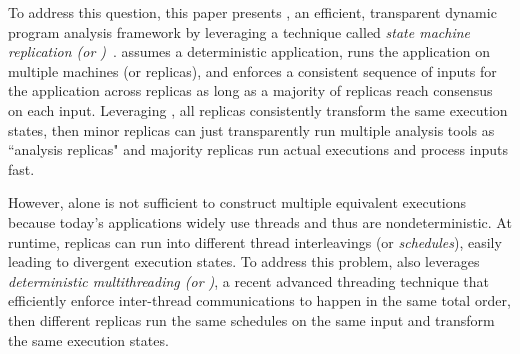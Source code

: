 

To address this question, this paper presents \xxx, an efficient, 
transparent dynamic program analysis framework by leveraging a technique called 
\emph{state machine replication (or \smr)}~\cite{paxos:simple, 
paxos:practical, paxos}. \smr assumes a deterministic application, runs the 
application on multiple machines (or replicas), and enforces a consistent 
sequence of inputs for the application across replicas as long as a majority of 
replicas reach consensus on each input. Leveraging \smr, all replicas
consistently transform the same execution states, then minor replicas can just
transparently run multiple analysis tools as ``analysis replicas" and majority
replicas run actual executions and process inputs fast.


However, \smr alone is not sufficient to construct multiple equivalent 
executions because today's applications widely use threads and thus are 
nondeterministic. At runtime, replicas can run into different thread
interleavings (or \emph{schedules}), easily leading to divergent execution
states. To address this problem, \xxx also leverages \emph{deterministic
multithreading (or \dmt)}, a recent advanced threading technique that
efficiently enforce inter-thread communications to happen in the same total
order, then different replicas run the same schedules on the same input and
transform the same execution states.


